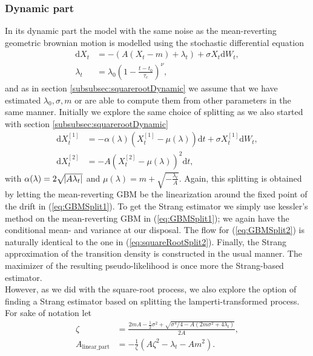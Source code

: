 \subsubsection{Dynamic part}\label{subsubsec:meanrevertingGBMDynamic}
In its dynamic part the model with the same noise as the mean-reverting geometric brownian motion is modelled using the stochastic differential equation
\begin{align}
    \mathrm{d}X_t &= -\left(A\left(X_t - m\right) + \lambda_t\right) + \sigma X_t \mathrm{d}W_t, \label{eq:GBM_dynamic_SDE}\\
    \lambda_t &= \lambda_0\left(1 - \frac{t - t_0}{\tau_c}\right)^\nu,
\end{align}
and as in section \ref{subsubsec:squarerootDynamic} we assume that we have estimated $\lambda_0, \sigma, m$ or are able to compute them from other parameters in the same manner. Initially we explore the same choice of splitting as we also started with section \ref{subsubsec:squarerootDynamic}
\begin{align}
    \mathrm{d}X_t^{[1]} &= -\alpha(\lambda)\left(X_t^{[1]} - \mu(\lambda)\right)  \mathrm{d}t + \sigma X_t^{[1]} \mathrm{d}W_t, \label{eq:GBMSplit1} \\
    \mathrm{d}X_t^{[2]} &= - A \left(X_t^{[2]} - \mu(\lambda)\right)^2 \mathrm{d}t, \label{eq:GBMSplit2}
\end{align}
with $\alpha(\lambda) = 2\sqrt{\abs{A\lambda_t}}$ and $\mu(\lambda) = m + \sqrt{-\frac{\lambda_t}{A}}$.
Again, this splitting is obtained by letting the mean-reverting GBM be the linearization around the fixed point of the drift in (\ref{eq:GBMSplit1}). To get the Strang estimator we simply use kessler's method on the mean-reverting GBM in (\ref{eq:GBMSplit1}); we again have the conditional mean- and variance at our disposal. The flow for (\ref{eq:GBMSplit2}) is naturally identical to the one in (\ref{eq:squareRootSplit2}). Finally, the Strang approximation of the transition density is constructed in the usual manner. The maximizer of the resulting pseudo-likelihood is once more the Strang-based estimator.\\
However, as we did with the square-root process, we also explore the option of finding a Strang estimator based on splitting the lamperti-transformed process. For sake of notation let
\begin{align}
    \zeta &= \frac{2mA - \frac{1}{2}\sigma^2 + \sqrt{\sigma^4/4 - A\left(2m\sigma^2 + 4\lambda_t\right)}}{2A},\\
    A_{\mathrm{linear\_part}} &= - \frac{1}{\zeta}\left(A \zeta^2 - \lambda_t - Am^2\right).
\end{align}
